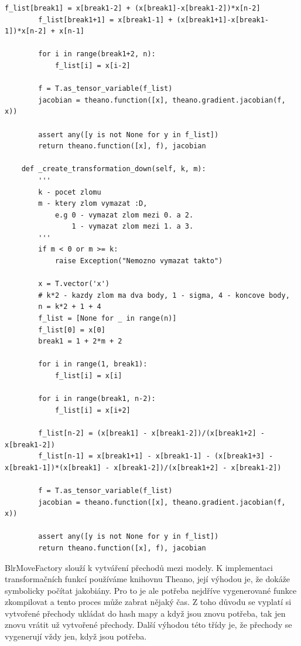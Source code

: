 \documentclass[czech,master,public,dept470,male,cpdeclaration,oneside, python]{diploma}
\begin{document}
\begin{lstlisting}[caption=BlrMoveFactory]
        f_list[break1] = x[break1-2] + (x[break1]-x[break1-2])*x[n-2]
        f_list[break1+1] = x[break1-1] + (x[break1+1]-x[break1-1])*x[n-2] + x[n-1]

        for i in range(break1+2, n):
            f_list[i] = x[i-2]

        f = T.as_tensor_variable(f_list)
        jacobian = theano.function([x], theano.gradient.jacobian(f, x))

        assert any([y is not None for y in f_list])
        return theano.function([x], f), jacobian

    def _create_transformation_down(self, k, m):
        '''
        k - pocet zlomu
        m - ktery zlom vymazat :D,
            e.g 0 - vymazat zlom mezi 0. a 2.
                1 - vymazat zlom mezi 1. a 3.
        '''
        if m < 0 or m >= k:
            raise Exception("Nemozno vymazat takto")

        x = T.vector('x')
        # k*2 - kazdy zlom ma dva body, 1 - sigma, 4 - koncove body,
        n = k*2 + 1 + 4
        f_list = [None for _ in range(n)]
        f_list[0] = x[0]
        break1 = 1 + 2*m + 2

        for i in range(1, break1):
            f_list[i] = x[i]

        for i in range(break1, n-2):
            f_list[i] = x[i+2]

        f_list[n-2] = (x[break1] - x[break1-2])/(x[break1+2] - x[break1-2])
        f_list[n-1] = x[break1+1] - x[break1-1] - (x[break1+3] - x[break1-1])*(x[break1] - x[break1-2])/(x[break1+2] - x[break1-2])

        f = T.as_tensor_variable(f_list)
        jacobian = theano.function([x], theano.gradient.jacobian(f, x))

        assert any([y is not None for y in f_list])
        return theano.function([x], f), jacobian
\end{lstlisting}

BlrMoveFactory slouží k vytváření přechodů mezi modely. K implementaci transformačních funkcí používáme knihovnu Theano\cite{theano}, její výhodou je, že dokáže symbolicky počítat jakobiány. Pro to je ale potřeba nejdříve vygenerované funkce zkompilovat a tento proces může zabrat nějaký čas. Z toho důvodu se vyplatí si vytvořené přechody ukládat do hash mapy a když jsou znovu potřeba, tak jen znovu vrátit už vytvořené přechody. Další výhodou této třídy je, že přechody se vygenerují vždy jen, když jsou potřeba.
\end{document}
